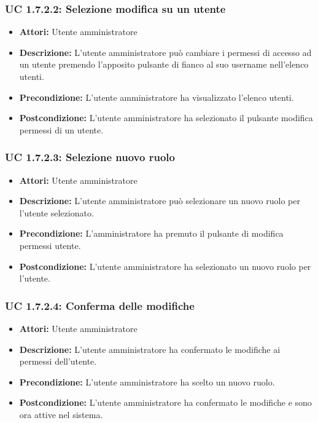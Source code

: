 \subsubsection{UC 1.7.2.2: Selezione modifica su un utente}

\begin{itemize}
    \item \textbf{Attori:} Utente amministratore
    \item \textbf{Descrizione:} L'utente amministratore può cambiare i permessi di accesso ad un utente premendo l'apposito pulsante di fianco al suo username nell'elenco utenti.
    \item \textbf{Precondizione:} L'utente amministratore ha visualizzato l'elenco utenti.
    \item \textbf{Postcondizione:} L'utente amministratore ha selezionato il pulsante modifica permessi di un utente.
\end{itemize}

\subsubsection{UC 1.7.2.3: Selezione nuovo ruolo}

\begin{itemize}
    \item \textbf{Attori:} Utente amministratore
    \item \textbf{Descrizione:} L'utente amministratore può selezionare un nuovo ruolo per l'utente selezionato.
    \item \textbf{Precondizione:} L'amministratore ha premuto il pulsante di modifica permessi utente.
    \item \textbf{Postcondizione:} L'utente amministratore ha selezionato un nuovo ruolo per l'utente.
\end{itemize}

\subsubsection{UC 1.7.2.4: Conferma delle modifiche}

\begin{itemize}
    \item \textbf{Attori:} Utente amministratore
    \item \textbf{Descrizione:} L'utente amministratore ha confermato le modifiche ai permessi dell'utente.
    \item \textbf{Precondizione:} L'utente amministratore ha scelto un nuovo ruolo.
    \item \textbf{Postcondizione:} L'utente amministratore ha confermato le modifiche e sono ora attive nel sistema.
\end{itemize}


